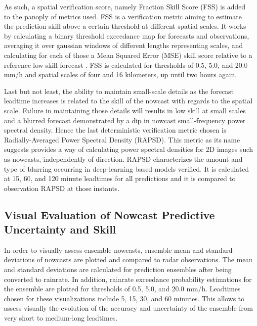 
As such, a spatial verification score, namely Fraction Skill Score (FSS) \cite{roberts_scale-selective_2008} is added to the panoply of metrics used. FSS is a verification metric aiming to estimate the prediction skill above a certain threshold at different spatial scales. It works by calculating a binary threshold exceedance map for forecasts and observations, averaging it over gaussian windows of different lengths representing scales, and calculating for each of those a Mean Squared Error (MSE) skill score relative to a reference low-skill forecast \cite{roberts_scale-selective_2008}. FSS is calculated for thresholds of 0.5, 5.0, and 20.0 mm/h and spatial scales of four and 16 kilometers, up until two hours again. 

Last but not least, the ability to maintain small-scale details as the forecast leadtime increases is related to the skill of the nowcast with regards to the spatial scale. Failure in maintaining those details will results in low skill at small scales and a blurred forecast demonstrated by a dip in nowcast small-frequency power spectral density. Hence the last deterministic verification metric chosen is Radially-Averaged Power Spectral Density (RAPSD). This metric as its name suggests provides a way of calculating power spectral densities for 2D images such as nowcasts, independently of direction. RAPSD characterizes the amount and type of blurring occurring in deep-learning based models verified. It is calculated at 15, 60, and 120 minute leadtimes for all predictions and it is compared to observation RAPSD at those instants. 

\subsection{Visual Evaluation of Nowcast Predictive Uncertainty and Skill}
\label{section:viz_methods}

In order to visually assess ensemble nowcasts, ensemble mean and standard deviations of nowcasts are plotted and compared to radar observations. The mean and standard deviations are calculated for prediction ensembles after being converted to rainrate. In addition, rainrate exceedance probability estimations for the ensemble are plotted for thresholds of 0.5, 5.0, and 20.0 mm/h. Leadtimes chosen for these visualizations include 5, 15, 30, and 60 minutes. This allows to assess visually the evolution of the accuracy and uncertainty of the ensemble from very short to medium-long leadtimes. 


